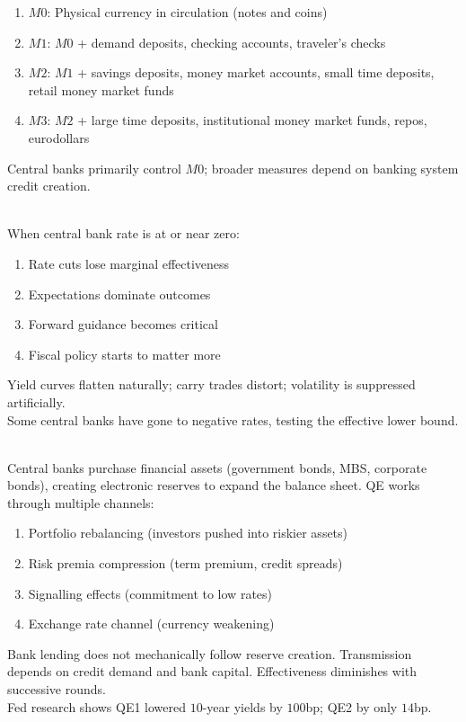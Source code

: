 \begin{remark} 
\begin{enumerate}[label=\roman*.]
\setlength{\itemsep}{0pt}
\item $M0$: Physical currency in circulation (notes and coins)
\item $M1$: $M0$ + demand deposits, checking accounts, traveler's checks
\item $M2$: $M1$ + savings deposits, money market accounts, small time deposits, retail money market funds
\item $M3$: $M2$ + large time deposits, institutional money market funds, repos, eurodollars
\end{enumerate}
Central banks primarily control $M0$; broader measures depend on banking system credit creation.
\end{remark}

\begin{remark} \\
When central bank rate is at or near zero:
\begin{enumerate}[label=\roman*.]
\setlength{\itemsep}{0pt}
\item Rate cuts lose marginal effectiveness
\item Expectations dominate outcomes
\item Forward guidance becomes critical
\item Fiscal policy starts to matter more
\end{enumerate}
Yield curves flatten naturally; carry trades distort; volatility is suppressed artificially.\\
Some central banks have gone to negative rates, testing the effective lower bound.
\end{remark}

\begin{remark} \\
Central banks purchase financial assets (government bonds, MBS, corporate bonds), creating electronic reserves to expand the balance sheet. QE works through multiple channels:
\begin{enumerate}[label=\roman*.]
\setlength{\itemsep}{0pt}
\item Portfolio rebalancing (investors pushed into riskier assets)
\item Risk premia compression (term premium, credit spreads)
\item Signalling effects (commitment to low rates)
\item Exchange rate channel (currency weakening)
\end{enumerate}
Bank lending does not mechanically follow reserve creation. Transmission depends on credit demand and bank capital. Effectiveness diminishes with successive rounds.\\
Fed research shows QE1 lowered $10$-year yields by $100$bp; QE2 by only $14$bp.
\end{remark}

